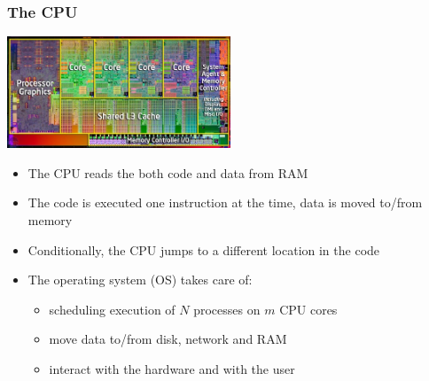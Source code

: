 \documentclass[handout]{beamer}
\begin{document}
\begin{frame}[fragile]
  \frametitle{The CPU}
  \begin{center}
  \includegraphics[width=0.5\textwidth]{insideintel.jpg}
  \end{center}
  \begin{itemize}
  \item The CPU reads the both code and data from RAM
  \item The code is executed one instruction at the time, data is
        moved to/from memory
  \item Conditionally, the CPU jumps to a different location in the code\pause
  \item The operating system (OS) takes care of:
        \begin{itemize} 
        \item scheduling execution of $N$ processes on $m$ CPU cores
        \item move data to/from disk, network and RAM
        \item interact with the hardware and with the user
        \end{itemize}
  \end{itemize} 
\end{frame}
\end{document}
